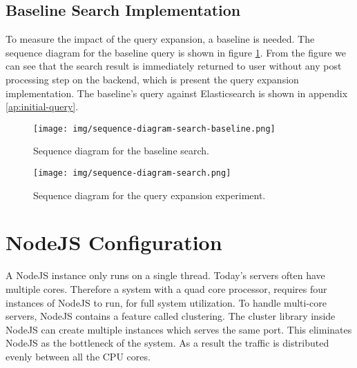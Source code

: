 \subsection{Baseline Search Implementation}
To measure the impact of the query expansion, a baseline is needed.
The sequence diagram for the baseline query is shown in figure \ref{fig:sequence-diagram-search-baseline}.
From the figure we can see that the search result is immediately returned to user without any post processing step on the backend,
which is present the query expansion implementation.
The baseline's query against Elasticsearch is shown in appendix \ref{ap:initial-query}.

\begin{figure}[h!]
\centering \texttt{[image: img/sequence-diagram-search-baseline.png]}
\caption{Sequence diagram for the baseline search.}
\label{fig:sequence-diagram-search-baseline}
\end{figure}

\begin{figure}[h!]
\centering \texttt{[image: img/sequence-diagram-search.png]}
\caption{Sequence diagram for the query expansion experiment.}
\label{fig:sequence-diagram-search}
\end{figure}

\section{NodeJS Configuration}
A NodeJS instance only runs on a single thread.
Today's servers often have multiple cores.
Therefore a system with a quad core processor, requires four instances of NodeJS to run, for full system utilization.
To handle multi-core servers, NodeJS contains a feature called clustering.
The cluster library inside NodeJS can create multiple instances which serves the same port.
This eliminates NodeJS as the bottleneck of the system.
As a result the traffic is distributed evenly between all the CPU cores.
